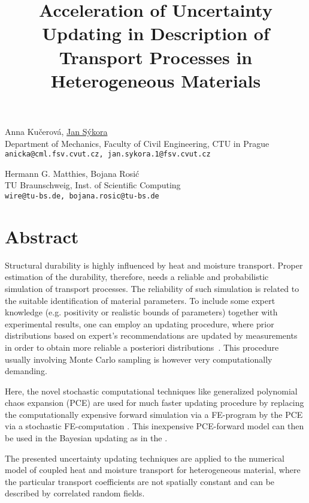 \title{Acceleration of Uncertainty Updating in Description of Transport Processes in Heterogeneous Materials}
\author{} \institute{}
\maketitle

\begin{center}
{\large Anna Ku\v{c}erov\'a, \underline{Jan S\'ykora}}\\
Department of Mechanics, Faculty of Civil Engineering, CTU in Prague\\
{\tt anicka@cml.fsv.cvut.cz, jan.sykora.1@fsv.cvut.cz}\\
\vspace{4mm}

{\large Hermann G. Matthies, Bojana Rosi\'c}\\
TU Braunschweig, Inst. of Scientific Computing\\
{\tt wire@tu-bs.de, bojana.rosic@tu-bs.de}
\end{center}

\section*{Abstract}
Structural durability is highly influenced by heat and moisture transport. Proper estimation of the durability, therefore, needs a reliable and probabilistic simulation of transport processes.  The reliability of such simulation is related to the suitable identification of material parameters. To include some expert knowledge (e.g. positivity or realistic bounds of parameters) together with experimental results, one can employ an updating procedure, where prior distributions based on expert's recommendations are updated by measurements in order to obtain more reliable a posteriori distributions~\cite{Kucerova:2010:AMC}. This procedure usually involving Monte Carlo sampling is however very computationally demanding.

Here, the novel stochastic computational techniques like generalized polynomial chaos expansion (PCE) are used for much faster updating procedure by replacing the computationally expensive forward simulation via a FE-program by the PCE via a stochastic FE-computation \cite{Matthies:2007:IB}. This inexpensive PCE-forward model can then be used in the Bayesian updating as in the \cite{Kucerova:2010:AMC}.

The presented uncertainty updating techniques are applied to the numerical model of coupled heat and moisture transport \cite{Kunzel:1997} for heterogeneous material, where the particular transport coefficients are not spatially constant and can be described by correlated random fields.

